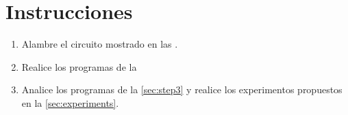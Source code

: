 %
%


\section{Instrucciones}%
\label{sec:instructions}
\begin{enumerate}[noitemsep]
	\item Alambre el circuito mostrado en las .
	\item Realice los programas de la 
 	\item Analice los programas de la \cref{sec:step3} y realice los experimentos propuestos en la \cref{sec:experiments}.
\end{enumerate}




